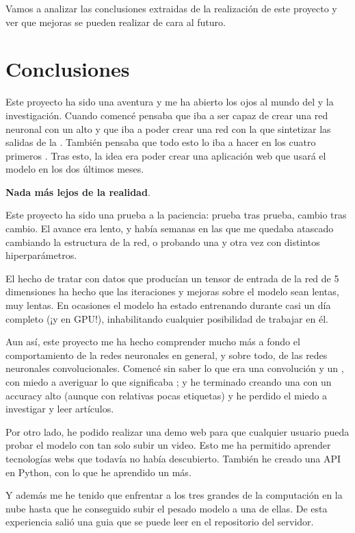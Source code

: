
Vamos a analizar las conclusiones extraidas de la realización de este proyecto y ver que mejoras se pueden realizar de cara al futuro.

\section{Conclusiones}

Este proyecto ha sido una aventura y me ha abierto los ojos al mundo del  y la investigación. Cuando comencé pensaba que iba a ser capaz de crear una red neuronal con un  alto y que iba a poder crear una red  con la que sintetizar las salidas de la . También pensaba que todo esto lo iba a hacer en los cuatro primeros . Tras esto, la idea era poder crear una aplicación web que usará el modelo en los dos últimos meses.

\textbf{Nada más lejos de la realidad}.

Este proyecto ha sido una prueba a la paciencia: prueba tras prueba, cambio tras cambio. El avance era lento, y había semanas en las que me quedaba atascado cambiando la estructura de la red, o probando una y otra vez con distintos hiperparámetros.

El hecho de tratar con datos que producían un tensor de entrada de la red de 5 dimensiones ha hecho que las iteraciones y mejoras sobre el modelo sean lentas, muy lentas. En ocasiones el modelo ha estado entrenando durante casi un día completo (¡y en GPU!), inhabilitando cualquier posibilidad de trabajar en él.

Aun así, este proyecto me ha hecho comprender mucho más a fondo el comportamiento de la redes neuronales en general, y sobre todo, de las redes neuronales convolucionales. Comencé sin saber lo que era una convolución y un , con miedo a averiguar lo que significaba ; y he terminado creando una  con un accuracy alto (aunque con relativas pocas etiquetas) y he perdido el miedo a investigar y leer artículos.

Por otro lado, he podido realizar una demo web para que cualquier usuario pueda probar el modelo con tan solo subir un video. Esto me ha permitido aprender tecnologías webs que todavía no había descubierto. También he creado una API en Python, con lo que he aprendido un  más.

Y además me he tenido que enfrentar a los tres grandes de la computación en la nube hasta que he conseguido subir el pesado modelo a una de ellas. De esta experiencia salió una guia que se puede leer en el repositorio del servidor.

